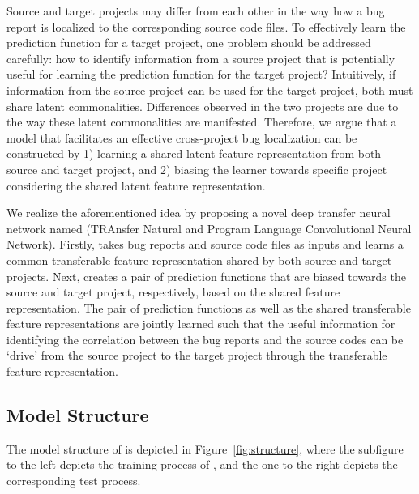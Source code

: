 Source and target projects may differ from each other in the way how a bug report is localized to the corresponding source code files. To effectively learn the prediction function for a target project, one problem should be addressed carefully: how to identify information from a source project that is potentially useful for learning the prediction function for the target project? Intuitively, if information from the source project can be used for the target project, both must share latent commonalities. Differences observed in the two projects are due to the way these latent commonalities are manifested. Therefore, we argue that a model that facilitates an effective cross-project bug localization can be constructed by 1) learning a shared latent feature representation from both source and target project, and 2) biasing the learner towards specific project considering the shared latent feature representation.

We realize the aforementioned idea by proposing a novel deep transfer neural network named \TRANPCNN (TRAnsfer Natural and Program Language Convolutional Neural Network). Firstly, \TRANPCNN takes bug reports and source code files as inputs and learns a common transferable feature representation shared by both source and target projects. Next, \TRANPCNN  creates a pair of prediction functions that are biased towards the source and target project, respectively, based on the shared feature representation. The pair of prediction functions as well as the shared transferable feature representations are
jointly learned such that the useful information for identifying the correlation between the bug reports and the source codes can be `drive' from the source project to the target project through the transferable feature representation.



\subsection{Model Structure}

The model structure of \TRANPCNN is depicted in Figure~\ref{fig:structure}, where the subfigure to the left depicts the training process of \TRANPCNN, and the one to the right depicts the corresponding test process.


